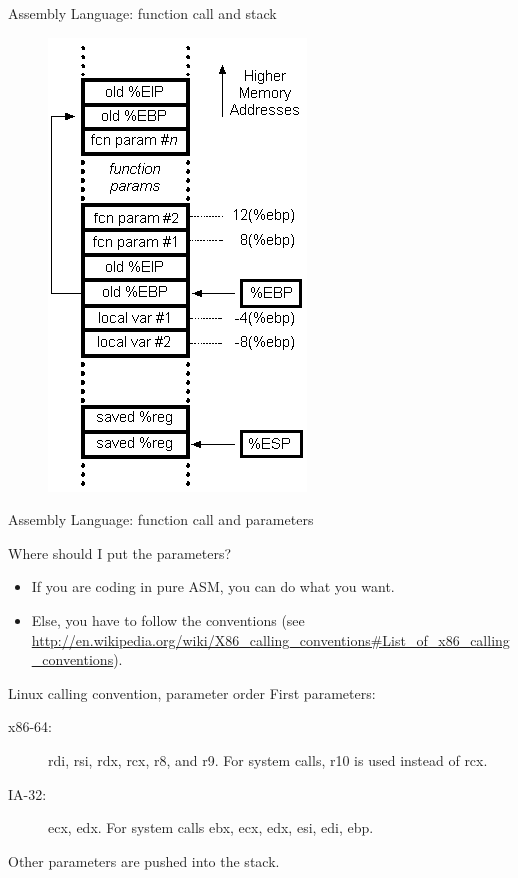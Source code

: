\begin{frame}{Assembly Language: function call and stack}
	\begin{figure}
		\includegraphics[height=.8\textheight]{imgs/stackframe-cdecl.png}
	\end{figure}
\end{frame}

\begin{frame}{Assembly Language: function call and parameters}
	\begin{block}{Where should I put the parameters?}
		\begin{itemize}
			\item If you are coding in pure ASM, you can do what you want.
			\item Else, you have to follow the conventions (see \url{http://en.wikipedia.org/wiki/X86\_calling\_conventions\#List\_of\_x86\_calling\_conventions}).
		\end{itemize}
	\end{block}
	\begin{block}{Linux calling convention, parameter order}
		First parameters:
		\begin{description}
			\item[x86-64:]rdi, rsi, rdx, rcx, r8, and r9. For system calls, r10 is used instead of rcx.
			\item[IA-32:]ecx, edx. For system calls  ebx, ecx, edx, esi, edi, ebp.
		\end{description}
		Other parameters are pushed into the stack.
	\end{block}
\end{frame}


